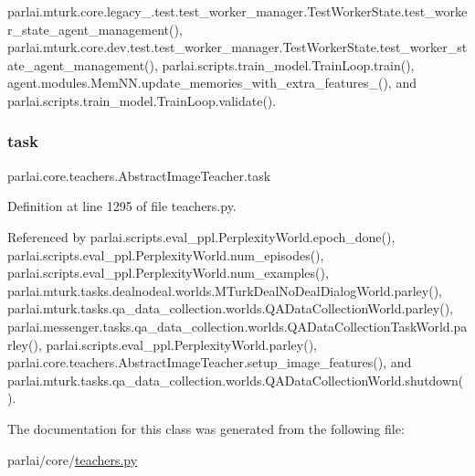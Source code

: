 parlai.\+mturk.\+core.\+legacy\+\_.\+test.\+test\+\_\+worker\+\_\+manager.\+Test\+Worker\+State.\+test\+\_\+worker\+\_\+state\+\_\+agent\+\_\+management(), parlai.\+mturk.\+core.\+dev.\+test.\+test\+\_\+worker\+\_\+manager.\+Test\+Worker\+State.\+test\+\_\+worker\+\_\+state\+\_\+agent\+\_\+management(), parlai.\+scripts.\+train\+\_\+model.\+Train\+Loop.\+train(), agent.\+modules.\+Mem\+N\+N.\+update\+\_\+memories\+\_\+with\+\_\+extra\+\_\+features\+\_\+(), and parlai.\+scripts.\+train\+\_\+model.\+Train\+Loop.\+validate().

\mbox{\label{classparlai_1_1core_1_1teachers_1_1AbstractImageTeacher_a78dca77e43183d22d75140ca113d821c}} 
\subsubsection{\texorpdfstring{task}{task}}
{\footnotesize\ttfamily parlai.\+core.\+teachers.\+Abstract\+Image\+Teacher.\+task}



Definition at line 1295 of file teachers.\+py.



Referenced by parlai.\+scripts.\+eval\+\_\+ppl.\+Perplexity\+World.\+epoch\+\_\+done(), parlai.\+scripts.\+eval\+\_\+ppl.\+Perplexity\+World.\+num\+\_\+episodes(), parlai.\+scripts.\+eval\+\_\+ppl.\+Perplexity\+World.\+num\+\_\+examples(), parlai.\+mturk.\+tasks.\+dealnodeal.\+worlds.\+M\+Turk\+Deal\+No\+Deal\+Dialog\+World.\+parley(), parlai.\+mturk.\+tasks.\+qa\+\_\+data\+\_\+collection.\+worlds.\+Q\+A\+Data\+Collection\+World.\+parley(), parlai.\+messenger.\+tasks.\+qa\+\_\+data\+\_\+collection.\+worlds.\+Q\+A\+Data\+Collection\+Task\+World.\+parley(), parlai.\+scripts.\+eval\+\_\+ppl.\+Perplexity\+World.\+parley(), parlai.\+core.\+teachers.\+Abstract\+Image\+Teacher.\+setup\+\_\+image\+\_\+features(), and parlai.\+mturk.\+tasks.\+qa\+\_\+data\+\_\+collection.\+worlds.\+Q\+A\+Data\+Collection\+World.\+shutdown().



The documentation for this class was generated from the following file\+:\begin{DoxyCompactItemize}
\item 
parlai/core/\hyperlink{teachers_8py}{teachers.\+py}\end{DoxyCompactItemize}
